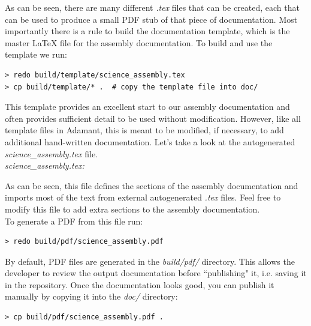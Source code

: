 As can be seen, there are many different \textit{.tex} files that can be created, each that can be used to produce a small PDF stub of that piece of documentation. Most importantly there is a rule to build the documentation template, which is the master \LaTeX{} file for the assembly documentation. To build and use the template we run:

\vspace{5mm} %
\begin{verbatim}
> redo build/template/science_assembly.tex
> cp build/template/* .  # copy the template file into doc/
\end{verbatim}
\vspace{5mm} %

This template provides an excellent start to our assembly documentation and often provides sufficient detail to be used without modification. However, like all template files in Adamant, this is meant to be modified, if necessary, to add additional hand-written documentation. Let's take a look at the autogenerated \textit{science\_assembly.tex} file. \\

\textit{science\_assembly.tex:}

As can be seen, this file defines the sections of the assembly documentation and imports most of the text from external autogenerated \textit{.tex} files. Feel free to modify this file to add extra sections to the assembly documentation. \\

To generate a PDF from this file run:

\vspace{5mm} %
\begin{verbatim}
> redo build/pdf/science_assembly.pdf
\end{verbatim}
\vspace{5mm} %

By default, PDF files are generated in the \textit{build/pdf/} directory. This allows the developer to review the output documentation before ``publishing" it, i.e. saving it in the repository. Once the documentation looks good, you can publish it manually by copying it into the \textit{doc/} directory:

\vspace{5mm} %
\begin{verbatim}
> cp build/pdf/science_assembly.pdf .
\end{verbatim}
\vspace{5mm} %

